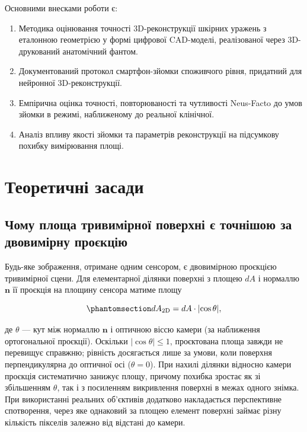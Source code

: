 \documentclass[
  ukrainian,
  10pt,
  a4paper,
  twocolumn]{article}
\providecommand{\tightlist}{%
  \setlength{\itemsep}{0pt}\setlength{\parskip}{0pt}}
\begin{document}
Основними внесками роботи є:

\begin{enumerate}
\def\labelenumi{\arabic{enumi}.}
\tightlist
\item
  Методика оцінювання точності 3D-реконструкції шкірних уражень з
  еталонною геометрією у формі цифрової CAD-моделі, реалізованої через
  3D-друкований анатомічний фантом.
\item
  Документований протокол смартфон-зйомки споживчого рівня, придатний
  для нейронної 3D-реконструкції.
\item
  Емпірична оцінка точності, повторюваності та чутливості Neus-Facto до
  умов зйомки в режимі, наближеному до реальної клінічної.
\item
  Аналіз впливу якості зйомки та параметрів реконструкції на підсумкову
  похибку вимірювання площі.
\end{enumerate}

\section{Теоретичні
засади}\label{ux442ux435ux43eux440ux435ux442ux438ux447ux43dux456-ux437ux430ux441ux430ux434ux438}

\subsection{Чому площа тривимірної поверхні є точнішою за двовимірну
проєкцію}\label{ux447ux43eux43cux443-ux43fux43bux43eux449ux430-ux442ux440ux438ux432ux438ux43cux456ux440ux43dux43eux457-ux43fux43eux432ux435ux440ux445ux43dux456-ux454-ux442ux43eux447ux43dux456ux448ux43eux44e-ux437ux430-ux434ux432ux43eux432ux438ux43cux456ux440ux43dux443-ux43fux440ux43eux454ux43aux446ux456ux44e}

Будь-яке зображення, отримане одним сенсором, є двовимірною проєкцією
тривимірної сцени. Для елементарної ділянки поверхні з площею \(dA\) і
нормаллю \(\mathbf{n}\) її проєкція на площину сенсора матиме площу

\begin{equation}\protect\phantomsection\label{eq-cosine-projection}{
dA_{\text{2D}} = dA \cdot \lvert\cos\theta\rvert,
}\end{equation}

де \(\theta\) --- кут між нормаллю \(\mathbf{n}\) і оптичною віссю
камери (за наближення ортогональної проєкції). Оскільки
\(\lvert\cos\theta\rvert \le 1\), проєктована площа завжди не перевищує
справжню; рівність досягається лише за умови, коли поверхня
перпендикулярна до оптичної осі (\(\theta = 0\)). При нахилі ділянки
відносно камери проєкція систематично занижує площу, причому похибка
зростає як зі збільшенням \(\theta\), так і з посиленням викривлення
поверхні в межах одного знімка. При використанні реальних об'єктивів
додатково накладається перспективне спотворення, через яке однаковий за
площею елемент поверхні займає різну кількість пікселів залежно від
відстані до камери.
\end{document}
